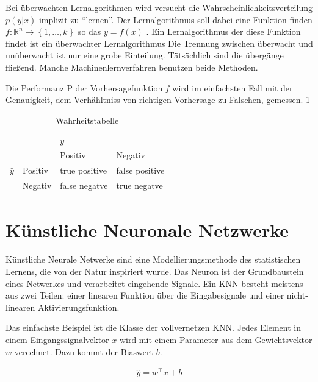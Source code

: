 Bei überwachten Lernalgorithmen wird versucht die Wahrscheinlichkeitsverteilung \(p(y | x)\) implizit zu ``lernen''.
Der Lernalgorithmus soll dabei eine Funktion finden \(f: \mathds{R}^n \rightarrow \left\{1,\dots,k \right\} \) so das \(y = f\left(x\right)\) \parencite[97 ff]{GoodfellowDeeplearning2016}.
Ein Lernalgorithmus der diese Funktion findet ist ein überwachter Lernalgorithmus 
Die Trennung zwischen überwacht und unüberwacht ist nur eine grobe Einteilung. Tätsächlich sind die übergänge fließend. 
Manche Machinenlernverfahren benutzen beide Methoden.  

Die Performanz P der Vorhersagefunktion \(f\) wird im einfachsten Fall mit der Genauigkeit,
dem Verhähltniss von richtigen Vorhersage zu Falschen, gemessen. 
\cref{tab:truth}
\begin{table}
    \caption{Wahrheitstabelle}
    \label{tab:truth}
    \begin{tabular}{llll}
                    &&\(y\)& \\
                            && Positiv       & Negativ \\
    \(\hat{y}\) & Positiv  & true positive  & false positive \\
                & Negativ & false negatve   & true negatve \\
    \end{tabular}       
\end{table}    
\section{Künstliche Neuronale Netzwerke}

Künstliche Neurale Netwerke  sind eine Modellierungsmethode des statistischen Lernens, die von der Natur inspiriert wurde. 
Das Neuron ist der Grundbaustein eines Netwerkes und verarbeitet eingehende Signale. 
Ein KNN besteht meistens aus zwei Teilen: einer linearen Funktion über die Eingabesignale und 
einer nicht-linearen Aktivierungsfunktion.

Das einfachste Beispiel ist die Klasse der vollvernetzen KNN. 
Jedes Element in einem Eingangssignalvektor \(x\) wird mit einem Parameter aus dem Gewichtsvektor \(w\) verechnet. Dazu kommt der Biaswert \(b\).

\begin{align}
    \hat { y } = w^{ \top } x + b
\end{align}



